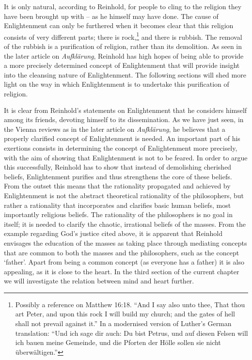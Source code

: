 It is only natural, according to Reinhold, for people to cling to the religion they have been brought up with {--} as he himself may have done. The cause of Enlightenment can only be furthered when it becomes clear that this religion consists of very different parts; there is rock,\footnote{ Possibly a reference on Matthew 16:18. ``And I say also unto thee, That thou art Peter, and upon this rock I will build my church; and the gates of hell shall not prevail against it.'' In a modernised version of Luther's German translation: ``Und ich sage dir auch: Du bist Petrus, und auf diesen Felsen will ich bauen meine Gemeinde, und die Pforten der H\"{o}lle sollen sie nicht \"{u}berw\"{a}ltigen.''} and there is rubbish. The removal of the rubbish is a purification of religion, rather than its demolition. As seen in the later article on \textit{Aufkl\"{a}rung}, Reinhold has high hopes of being able to provide a more precisely determined concept of Enlightenment that will provide insight into the cleansing nature of Enlightenment. The following sections will shed more light on the way in which Enlightenment is to undertake this purification of religion. 

It is clear from Reinhold's statements on Enlightenment that he considers himself among its friends, devoting himself to its dissemination. As we have just seen, in the Vienna reviews as in the later article on \textit{Aufkl\"{a}rung}, he believes that a properly clarified concept of Enlightenment is needed. An important part of his exertions consists in determining the concept of Enlightenment more precisely, with the aim of showing that Enlightenment is not to be feared. In order to argue this successfully, Reinhold has to show that instead of demolishing cherished beliefs, Enlightenment purifies and thus strengthens the core of these beliefs. From the outset this means that the rationality propagated and achieved by Enlightenment is not the abstract theoretical rationality of the philosophers, but rather a rationality that incorporates and clarifies basic human beliefs, most importantly religious beliefs. The rationality of the philosophers is no goal in itself; it is needed to clarify the chaotic, irrational beliefs of the masses. From the example regarding God's justice cited above, it is apparent that Reinhold envisages the education of the masses as taking place through mediating concepts that are common to both the masses and the philosophers, such as the concept `father'. Apart from being a common concept (as everyone has a father) it is also appealing, as it is close to the heart. In the third section of the current chapter we will investigate the relation between mind and heart further. 


